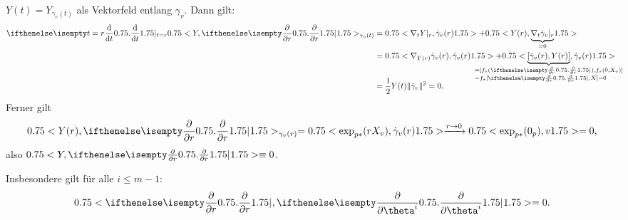 \begin{bew}
$Y(t) = Y_{\gamma_v(t)}$ als Vektorfeld entlang $\gamma_v$.
Dann gilt:
\begin{align*}
	\difffrac[t=r]{}{t} \left<Y,\pdifffrac{}{r}\right>_{\gamma_v(t)} & = \left<\nabla_tY|_r, \dot \gamma_v(r)\right> + \left<Y(r), \smash{\underbrace{\nabla_t\dot\gamma_v|_r}_{=0}}\right> \vphantom{\underbrace{\gamma_v}_{0}}\\
	& = \left<\nabla_{Y(r)}\dot\gamma_v(r), \dot \gamma_v(r)\right> + \left< \smash{\underbrace{[\dot\gamma_v(r),Y(r)]}_{\mathclap{\begin{subarray}{l}= [f_{*}(\pdifffrac{}{r}),f_{*}(0,X_v)]\\ = f_{*}[\pdifffrac{}{r},X] = 0\end{subarray}}}}, \dot \gamma_v(r) \vphantom{\nabla_{Y(r)}} \right>  \vphantom{\underbrace{\gamma_v(r)}_{\pdifffrac{}{r}} }\\
	&= \frac{1}{2}Y(t) \|\dot\gamma_v\|^2 = 0.
\end{align*}
Ferner gilt
\begin{align*}
	\left<Y(r),\pdifffrac{}{r}\right>_{\gamma_v(r)} = \left<\exp_{p*}(rX_v),\dot\gamma_v(r)\right> \xrightarrow{r \to 0}\left<\exp_{p*}(0_p),v\right> = 0,
\end{align*}
also $\left<Y,\pdifffrac{}{r}\right> \equiv 0$.
\end{bew}

\begin{bem}
  Insbesondere gilt für alle $i \leq m-1$:
  \begin{align*}
    \left<\pdifffrac{}{r}, \pdifffrac{}{\theta^i}\right> = 0.
  \end{align*}
\end{bem}

